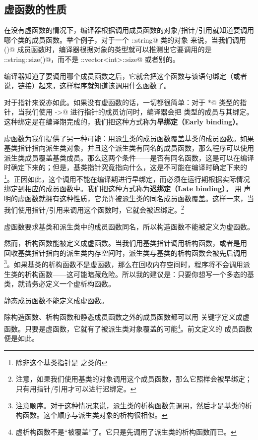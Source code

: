 \subsection*{虚函数的性质}
在没有虚函数的情况下，编译器根据调用成员函数的对象/指针/引用就知道要调用哪个类的成员函数。举个例子，对于一个 \lstinline@std::string@ 类的对象 \lstinline@str@ 来说，当我们调用 \lstinline@size()@ 成员函数时，编译器根据对象的类型就可以推测出它要调用的是 \lstinline@std::string::size()@，而不是 \lstinline@std::vector<int>::size@ 或者别的。\par
编译器知道了要调用哪个成员函数之后，它就会把这个函数与该语句绑定（或者说，链接）起来，这样程序就知道该调用什么函数了。\par
对于指针来说亦如此。如果没有虚函数的话，一切都很简单：对于 \lstinline@Type*@ 类型的指针，当我们使用 \lstinline@->@ 进行指针的成员访问时，编译器会把 \lstinline@Type@ 类型的成员与其绑定。这种绑定是在编译期完成的，我们把这种方式称为\textbf{早绑定（Early binding）}。\par
虚函数为我们提供了另一种可能：用派生类的成员函数覆盖基类的成员函数。如果基类指针指向派生类对象，并且这个派生类有同名的成员函数，那么程序可以使用派生类成员覆盖基类成员。那么这两个条件——是否有同名函数，这是可以在编译时确定下来的；但是，基类指针究竟指向什么，这是不可能在编译时确定下来的\footnote{除非这个基类指针是 \lstinline@constexpr@ 之类的}。正因如此，这个调用不能在编译期进行早绑定，而必须在运行期根据实际情况绑定到相应的成员函数中。我们把这种方式称为\textbf{迟绑定（Late binding）}。
用 \lstinline@virtual@ 声明的虚函数就拥有这种性质，它允许被派生类的同名成员函数覆盖。这样一来，当我们使用指针/引用来调用这个函数时，它就会被迟绑定。\footnote{注意，如果我们使用基类的对象调用这个成员函数，那么它照样会被早绑定；只有用指针/引用才可以进行迟绑定。}\par
虚函数要求基类和派生类中的成员函数同名，所以构造函数不能被定义为虚函数。\par
然而，析构函数能被定义成虚函数。当我们用基类指针调用析构函数，或者是用 \lstinline@delete@ 回收基类指针指向的派生类内存空间时，派生类与基类的析构函数会被先后调用\footnote{注意顺序。对于这种情况来说，派生类的析构函数先调用，然后才是基类的析构函数。这个顺序与派生类对象的析构很相似。}。如果基类的析构函数不是虚函数，那么在回收内存空间时，程序将不会调用派生类的析构函数——这可能暗藏危险。所以我的建议是：只要你想写一个多态的基类，就请务必定义一个虚析构函数。\par
静态成员函数不能定义成虚函数。\par
除构造函数、析构函数和静态成员函数之外的成员函数都可以用 \lstinline@virtual@ 关键字定义成虚函数。只要是虚函数，它就有了被派生类对象覆盖的可能\footnote{虚析构函数不是``被覆盖''了。它只是先调用了派生类的析构函数而已。}。前文定义的 \lstinline@area@ 成员函数便是如此。\par
